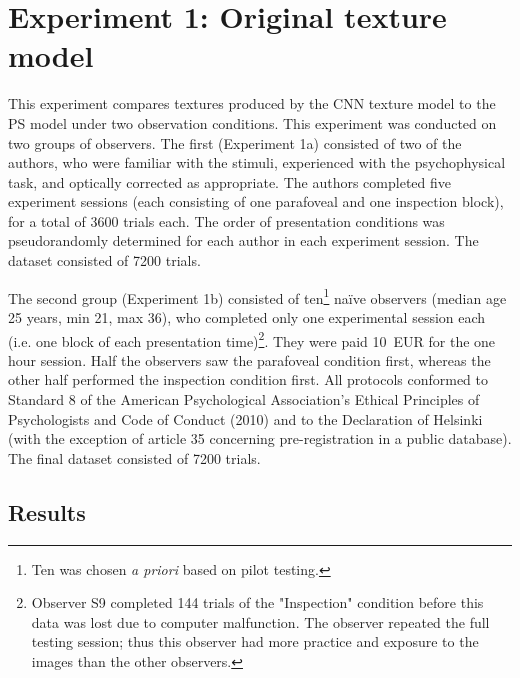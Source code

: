\documentclass[doc, 11pt,a4paper,natbib]{apa6}\usepackage[]{graphicx}\usepackage[]{color}
\begin{document}
\section{Experiment 1: Original texture model}



This experiment compares textures produced by the CNN texture model to the PS model under two observation conditions.
This experiment was conducted on two groups of observers.
The first (Experiment 1a) consisted of two of the authors, who were familiar with the stimuli, experienced with the psychophysical task, and optically corrected as appropriate.
The authors completed five experiment sessions (each consisting of one parafoveal and one inspection block), for a total of 3600 trials each.
The order of presentation conditions was pseudorandomly determined for each author in each experiment session.
The dataset consisted of 7200 trials.



The second group (Experiment 1b) consisted of ten\footnote{Ten was chosen \textit{a priori} based on pilot testing.} na\"{i}ve observers (median age 25 years, min 21, max 36), who completed only one experimental session each (i.e. one block of each presentation time)\footnote{
Observer S9 completed 144 trials of the "Inspection" condition before this data was lost due to computer malfunction. The observer repeated the full testing session; thus this observer had more practice and exposure to the images than the other observers.}.
They were paid 10~EUR for the one hour session.
Half the observers saw the parafoveal condition first, whereas the other half performed the inspection condition first.
All protocols conformed to Standard 8 of the American Psychological Association’s Ethical Principles of Psychologists and Code of Conduct (2010) and to the Declaration of Helsinki (with the exception of article 35 concerning pre-registration in a public database).
The final dataset consisted of 7200 trials.

\subsection{Results}
\end{document}

